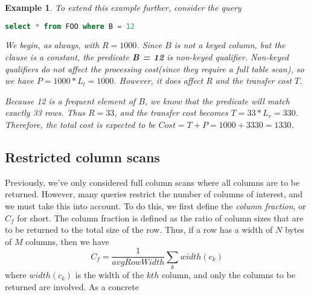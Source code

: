 \documentclass[10pt]{amsart}
\newtheorem{exmp}{Example}[section]
\begin{document}
\begin{exmp}
To extend this example further, consider the query
\begin{lstlisting}[frame=single,language=SQL]
select * from FOO where B = 12
\end{lstlisting}
We begin, as always, with $R=1000$. Since $B$ is not a keyed column, but the clause is a constant, the predicate \textbf{B = 12} is non-keyed qualifier. Non-keyed qualifiers do not affect the processing cost(since they require a full table scan), so we have $P = 1000*L_l = 1000$. However, it \emph{does} affect $R$ and the transfer cost $T$. 

Because 12 is a frequent element of $B$, we know that the predicate will match exactly 33 rows. Thus $R = 33$, and the transfer cost becomes $T = 33*L_r = 330$. Therefore, the total cost is expected to be $Cost = T+P = 1000+3330 = 1330$.

\end{exmp}

\subsection{Restricted column scans}
Previously, we've only considered full column scans where all columns are to be returned. However, many queries restrict the number of columns of interest, and we must take this into account. To do this, we first define the \emph{column fraction}, or $C_f$ for short. The column fraction is defined as the ratio of column sizes that are to be returned to the total size of the row. Thus, if a row has a width of $N$ bytes of $M$ columns, then we have
\begin{equation}
				C_f = \frac{1}{avgRowWidth}\sum_k width(c_k)
\end{equation}
where $width(c_k)$ is the width of the $kth$ column, and only the columns to be returned are involved. As a concrete
\end{document}
